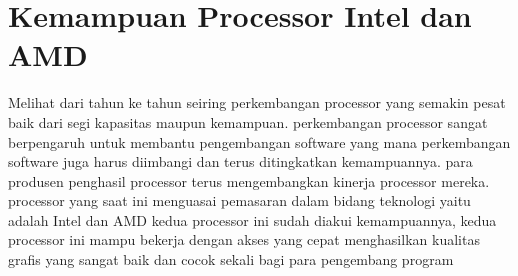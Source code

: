 \section{Kemampuan Processor Intel dan AMD}
	Melihat dari tahun ke tahun seiring perkembangan processor yang semakin pesat baik dari segi kapasitas maupun kemampuan. perkembangan processor sangat berpengaruh untuk membantu pengembangan software yang mana perkembangan software juga harus diimbangi dan terus ditingkatkan kemampuannya. para produsen penghasil processor terus mengembangkan kinerja processor mereka. processor yang saat ini menguasai pemasaran dalam bidang teknologi yaitu adalah Intel dan AMD kedua processor ini sudah diakui kemampuannya, kedua processor ini mampu bekerja dengan akses yang cepat menghasilkan kualitas grafis yang sangat baik dan cocok sekali bagi para pengembang program